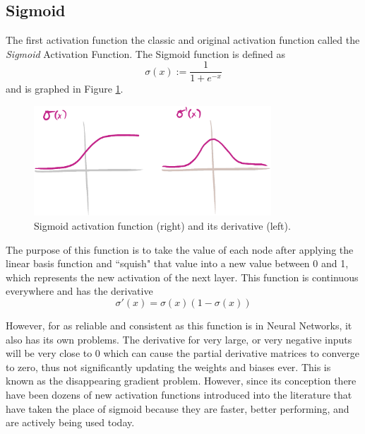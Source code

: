 \documentclass[12pt]{report}
\begin{document}
\subsection{Sigmoid}
The first activation function the classic and original activation function called the \emph{Sigmoid} Activation Function. The Sigmoid function is defined as
$$\sigma(x) := \frac{1}{1+e^{-x}}$$
and is graphed in Figure \ref{sigmoid}.
\begin{figure}[hbt!]
    \centering
    \includegraphics[width=3.5in]{figures/sigmoid.PNG}
    \caption{Sigmoid activation function (right) and its derivative (left).}
    \label{sigmoid}
\end{figure}
The purpose of this function is to take the value of each node after applying the linear basis function and ``squish" that value into a new value between 0 and 1, which represents the new activation of the next layer. This function is continuous everywhere and has the derivative
$$\sigma'(x) = \sigma(x)(1 - \sigma(x))$$

However, for as reliable and consistent as this function is in Neural Networks, it also has its own problems. The derivative for very large, or very negative inputs will be very close to 0 which can cause the partial derivative matrices to converge to zero, thus not significantly updating the weights and biases ever. This is known as the disappearing gradient problem. However, since its conception there have been dozens of new activation functions introduced into the literature that have taken the place of sigmoid because they are faster, better performing, and are actively being used today.
\end{document}
